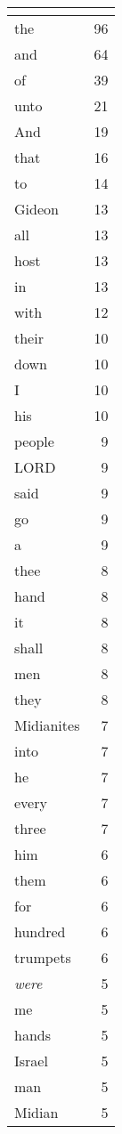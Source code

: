 \begin{center}
\begin{longtable}{l|r}
\hline \multicolumn{2}{c}{{ }} \\ \hline
\endfoot 
the & 96\\ \hline 
and & 64\\ \hline 
of & 39\\ \hline 
unto & 21\\ \hline 
And & 19\\ \hline 
that & 16\\ \hline 
to & 14\\ \hline 
Gideon & 13\\ \hline 
all & 13\\ \hline 
host & 13\\ \hline 
in & 13\\ \hline 
with & 12\\ \hline 
their & 10\\ \hline 
down & 10\\ \hline 
I & 10\\ \hline 
his & 10\\ \hline 
people & 9\\ \hline 
LORD & 9\\ \hline 
said & 9\\ \hline 
go & 9\\ \hline 
a & 9\\ \hline 
thee & 8\\ \hline 
hand & 8\\ \hline 
it & 8\\ \hline 
shall & 8\\ \hline 
men & 8\\ \hline 
they & 8\\ \hline 
Midianites & 7\\ \hline 
into & 7\\ \hline 
he & 7\\ \hline 
every & 7\\ \hline 
three & 7\\ \hline 
him & 6\\ \hline 
them & 6\\ \hline 
for & 6\\ \hline 
hundred & 6\\ \hline 
trumpets & 6\\ \hline 
\emph{were} & 5\\ \hline 
me & 5\\ \hline 
hands & 5\\ \hline 
Israel & 5\\ \hline 
man & 5\\ \hline 
Midian & 5\\ \hline 

\end{longtable}
\end{center}
